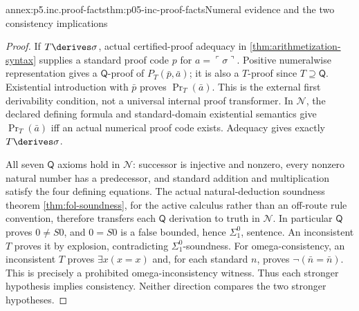 \begin{annexitem}{annex:p5.inc.proof-facts}{thm:p05-inc-proof-facts}{Numeral evidence and the two consistency implications}
\begin{proof}
If \(T\derives\sigma\), actual certified-proof adequacy in
\cref{thm:arithmetization-syntax} supplies a standard proof code
\(p\) for \(a=\ulcorner\sigma\urcorner\). Positive numeralwise
representation gives a \(\mathsf Q\)-proof of
\(P_T(\bar p,\bar a)\); it is also a \(T\)-proof since
\(T\supseteq\mathsf Q\). Existential introduction with \(\bar p\)
proves \(\operatorname{Pr}_T(\bar a)\). This is the external first
derivability condition, not a universal internal proof transformer.
In \(\mathcal N\), the declared defining formula and standard-domain
existential semantics give
\(\operatorname{Pr}_T(\bar a)\) iff an actual numerical proof code
exists. Adequacy gives exactly \(T\derives\sigma\).

All seven \(\mathsf Q\) axioms hold in \(\mathcal N\): successor
is injective and nonzero, every nonzero natural number has a predecessor,
and standard addition and multiplication satisfy the four defining
equations. The actual natural-deduction soundness theorem
\cref{thm:fol-soundness}, for the active calculus rather than an
off-route rule convention, therefore transfers each \(\mathsf Q\)
derivation to truth in \(\mathcal N\). In
particular \(\mathsf Q\) proves \(0\neq S0\), and \(0=S0\)
is a false bounded, hence \(\Sigma^0_1\), sentence. An inconsistent
\(T\) proves it by explosion, contradicting \(\Sigma^0_1\)-soundness.
For omega-consistency, an inconsistent \(T\) proves
\(\exists x(x=x)\) and, for each standard \(n\), proves
\(\neg(\bar n=\bar n)\). This is precisely a prohibited
omega-inconsistency witness. Thus each stronger hypothesis implies
consistency. Neither direction compares the two stronger hypotheses.
\end{proof}
\end{annexitem}

